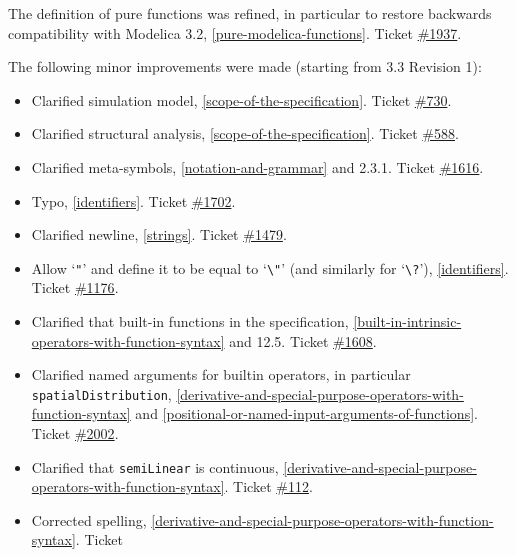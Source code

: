 The definition of pure functions was refined, in particular to restore
backwards compatibility with Modelica 3.2, \cref{pure-modelica-functions}. Ticket
\href{https://github.com/modelica/ModelicaSpecification/issues/1937}{\#1937}.

The following minor improvements were made (starting from 3.3 Revision 1):
\begin{itemize}
\item
  Clarified simulation model, \cref{scope-of-the-specification}. Ticket
  \href{https://github.com/modelica/ModelicaSpecification/issues/730}{\#730}.
\item
  Clarified structural analysis, \cref{scope-of-the-specification}. Ticket
  \href{https://github.com/modelica/ModelicaSpecification/issues/588}{\#588}.
\item
  Clarified meta-symbols, \cref{notation-and-grammar} and 2.3.1. Ticket
  \href{https://github.com/modelica/ModelicaSpecification/issues/1616}{\#1616}.
\item
  Typo, \cref{identifiers}. Ticket
  \href{https://github.com/modelica/ModelicaSpecification/issues/1702}{\#1702}.
\item
  Clarified newline, \cref{strings}. Ticket
  \href{https://github.com/modelica/ModelicaSpecification/issues/1479}{\#1479}.
\item
  Allow `\lstinline!"!' and define it to be equal to `\lstinline!\"!' (and
  similarly for `\lstinline!\?!'), \cref{identifiers}. Ticket
  \href{https://github.com/modelica/ModelicaSpecification/issues/1176}{\#1176}.
\item
  Clarified that built-in functions in the specification, \cref{built-in-intrinsic-operators-with-function-syntax}
  and 12.5. Ticket
  \href{https://github.com/modelica/ModelicaSpecification/issues/1608}{\#1608}.
\item
  Clarified named arguments for builtin operators, in particular \lstinline!spatialDistribution!, \cref{derivative-and-special-purpose-operators-with-function-syntax} and \cref{positional-or-named-input-arguments-of-functions}.
  Ticket \href{https://github.com/modelica/ModelicaSpecification/issues/2002}{\#2002}.
\item
  Clarified that \lstinline!semiLinear! is continuous, \cref{derivative-and-special-purpose-operators-with-function-syntax}.
  Ticket \href{https://github.com/modelica/ModelicaSpecification/issues/112}{\#112}.
\item
  Corrected spelling, \cref{derivative-and-special-purpose-operators-with-function-syntax}. Ticket

\end{itemize}
